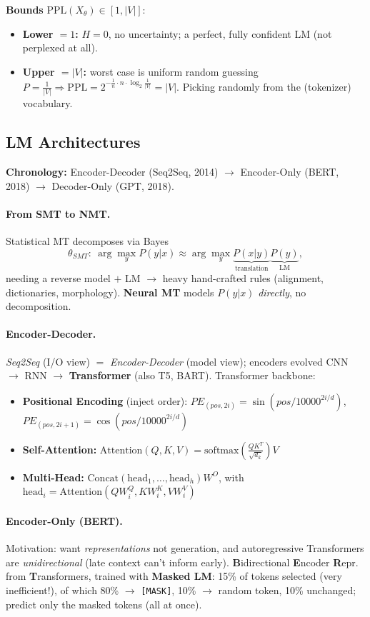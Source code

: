 \documentclass{article}
\begin{document}
\noindent\textbf{Bounds} $\text{PPL}(X_\theta)\in[1,|V|]$:
\begin{itemize}
    \item \textbf{Lower $=1$:} $H=0$, no uncertainty; a perfect, fully confident LM (not perplexed at all).
    \item \textbf{Upper $=|V|$:} worst case is uniform random guessing $P=\frac{1}{|V|}\Rightarrow \text{PPL}=2^{-\frac{1}{n}\cdot n\cdot \log_2\frac{1}{|V|}}=|V|$. Picking randomly from the (tokenizer) vocabulary.
\end{itemize}

\subsection{LM Architectures}
\textbf{Chronology:} Encoder-Decoder (Seq2Seq, 2014) $\rightarrow$ Encoder-Only (BERT, 2018) $\rightarrow$ Decoder-Only (GPT, 2018).

\paragraph{From SMT to NMT.} Statistical MT decomposes via Bayes
$$\theta_{SMT}:\ \arg\max_y P(y|x) \approx \arg\max_y \underbrace{P(x|y)}_{\text{translation}}\underbrace{P(y)}_{\text{LM}},$$
needing a reverse model $+$ LM $\rightarrow$ heavy hand-crafted rules (alignment, dictionaries, morphology). \textbf{Neural MT} models $P(y|x)$ \textit{directly}, no decomposition.

\paragraph{Encoder-Decoder.} \textit{Seq2Seq} (I/O view) $=$ \textit{Encoder-Decoder} (model view); encoders evolved CNN $\rightarrow$ RNN $\rightarrow$ \textbf{Transformer} (also T5, BART). Transformer backbone:
\begin{itemize}
    \item \textbf{Positional Encoding} (inject order): $PE_{(pos,2i)}=\sin(pos/10000^{2i/d})$, $PE_{(pos,2i+1)}=\cos(pos/10000^{2i/d})$
    \item \textbf{Self-Attention:} $\text{Attention}(Q,K,V)=\text{softmax}\!\left(\frac{QK^T}{\sqrt{d_k}}\right)V$
    \item \textbf{Multi-Head:} $\text{Concat}(\text{head}_1,\dots,\text{head}_h)W^O$, with $\text{head}_i=\text{Attention}(QW_i^Q,KW_i^K,VW_i^V)$
\end{itemize}

\paragraph{Encoder-Only (BERT).} Motivation: want \textit{representations} not generation, and autoregressive Transformers are \textit{unidirectional} (late context can't inform early). \textbf{B}idirectional \textbf{E}ncoder \textbf{R}epr. from \textbf{T}ransformers, trained with \textbf{Masked LM}: 15\% of tokens selected (very inefficient!), of which 80\% $\rightarrow$ \texttt{[MASK]}, 10\% $\rightarrow$ random token, 10\% unchanged; predict only the masked tokens (all at once).
\end{document}
